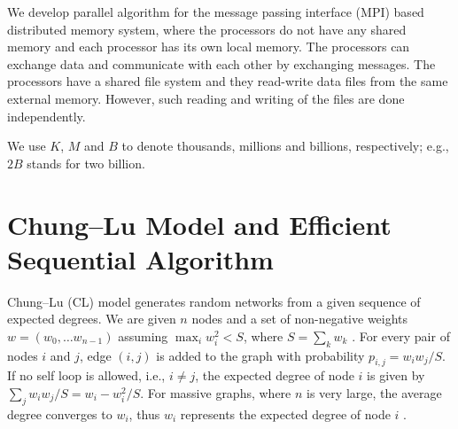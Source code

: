 \documentclass[conference,letterpaper,10pt]{IEEEtran}
\begin{document}
We develop parallel algorithm for the message passing interface (MPI) based distributed memory system, where the processors do not have any shared memory and each processor has its own local memory. The processors can exchange data and communicate with each other by exchanging messages. The processors have a shared file system and they read-write data files from the same external memory. However, such reading and writing of the files are done independently.

We use $K$, $M$ and $B$ to denote thousands, millions and billions, respectively; e.g., $2B$ stands for two billion.


\section{Chung--Lu Model and Efficient Sequential Algorithm}
\label{Section:PCL:chung-lu-model}
Chung--Lu (CL) model \cite{Chung2002} generates random networks from a given sequence of expected degrees. We are given $n$ nodes and a set of non-negative weights $w=(w_0,\ldots w_{n-1})$ assuming $\max_{i}w_{i}^2 < S$, where $S=\sum_{k}w_{k}$ \cite{Chung2002}. For every pair of nodes $i$ and $j$, edge $(i,j)$ is added to the graph with probability $p_{i,j}=w_{i}w_{j}/S$.
If no self loop is allowed, i.e., $i \neq j$, the expected degree of node $i$ is given by $\sum_{j}w_{i}w_{j}/S=w_{i} - w^2_{i}/S$. For massive graphs, where $n$ is very large, the average degree converges to $w_i$, thus $w_i$ represents the expected degree of node $i$ \cite{Miller2011}.
\end{document}
